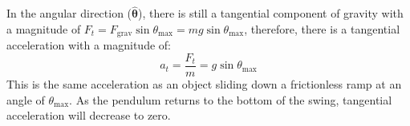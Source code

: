 In the angular direction ($\hat{\bm\theta}$), there is still a tangential
component of gravity with a magnitude of
$F_t=F_\text{grav}\sin\theta_\text{max}=mg\sin\theta_\text{max}$, therefore, there
is a tangential acceleration with a magnitude of:
\begin{equation}
  a_t=\frac{F_t}m=g\sin\theta_\text{max}
\end{equation}
This is the same acceleration as an object sliding down a frictionless ramp at
an angle of $\theta_\text{max}$. As the pendulum returns to the bottom of the
swing, tangential acceleration will decrease to zero.

